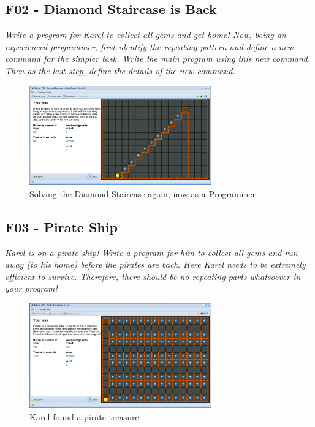 \documentclass[article,A4,12pt]{llncs}
\begin{document}
\subsection{F02 - Diamond Staircase is Back}

{\em Write a program for Karel to collect all gems and get home! 
Now, being an experienced programmer, first identify the repeating 
pattern and define a new command for the simpler task. Write the main 
program using this new command. Then as the last step, define the 
details of the new command.}\\[-7mm]

\begin{figure}[!ht]
\begin{center}
\includegraphics[width=0.7\textwidth]{img/f02.png}
\end{center}
\vspace{-4mm}
\caption{Solving the Diamond Staircase again, now as a Programmer}
\label{fig:f02}
\vspace{-10mm}
\end{figure}
\noindent

\subsection{F03 - Pirate Ship}

{\em Karel is on a pirate ship! Write a program for him to collect all 
gems and run away (to his home) before the pirates are back. Here Karel 
needs to be extremely efficient to survive. Therefore, there should be 
no repeating parts whatsoever in your program!}\\[-7mm]


\begin{figure}[!ht]
\begin{center}
\includegraphics[width=0.7\textwidth]{img/f03.png}
\end{center}
\vspace{-4mm}
\caption{Karel found a pirate treasure}
\label{fig:f03}
\vspace{-10mm}
\end{figure}
\noindent
\end{document}
